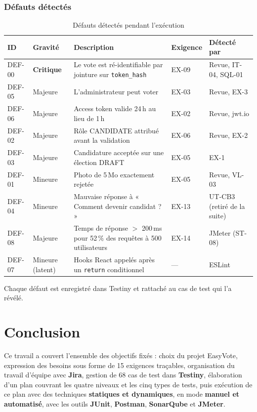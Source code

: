 \documentclass[12pt,a4paper]{report}
\begin{document}
\subsection{Défauts détectés}
\begin{table}[H]
\centering
\caption{Défauts détectés pendant l'exécution}
\small
\begin{tabularx}{\textwidth}{@{}p{1.5cm}p{1.8cm}Xp{1.5cm}p{3.1cm}@{}}
\toprule
\rowcolor{evlight}\textbf{ID} & \textbf{Gravité} & \textbf{Description} & \textbf{Exigence} & \textbf{Détecté par}\\
\midrule
DEF-00 & \textcolor{kored}{\textbf{Critique}} & Le vote est ré-identifiable par jointure sur \texttt{token\_hash} & EX-09 & Revue, IT-04, SQL-01\\
DEF-05 & Majeure & L'administrateur peut voter & EX-03 & Revue, EX-3\\
DEF-06 & Majeure & Access token valide 24\,h au lieu de 1\,h & EX-02 & Revue, jwt.io\\
DEF-02 & Majeure & Rôle CANDIDATE attribué avant la validation & EX-06 & Revue, EX-2\\
DEF-03 & Majeure & Candidature acceptée sur une élection DRAFT & EX-05 & EX-1\\
DEF-01 & Mineure & Photo de 5\,Mo exactement rejetée & EX-05 & Revue, VL-03\\
DEF-04 & Mineure & Mauvaise réponse à « Comment devenir candidat ? » & EX-13 & UT-CB3 (retiré de la suite)\\
DEF-08 & Majeure & Temps de réponse $>$ 200\,ms pour 52\,\% des requêtes à 500 utilisateurs & EX-14 & JMeter (ST-08)\\
DEF-07 & Mineure (latent) & Hooks React appelés après un \texttt{return} conditionnel & --- & ESLint\\
\bottomrule
\end{tabularx}
\end{table}
Chaque défaut est enregistré dans Testiny et rattaché au cas de test qui l'a révélé.

\chapter*{Conclusion}

Ce travail a couvert l'ensemble des objectifs fixés : choix du projet EasyVote, expression des besoins sous forme de 15 exigences traçables, organisation du travail d'équipe avec \textbf{Jira}, gestion de 68 cas de test dans \textbf{Testiny}, élaboration d'un plan couvrant les quatre niveaux et les cinq types de tests, puis exécution de ce plan avec des techniques \textbf{statiques et dynamiques}, en mode \textbf{manuel et automatisé}, avec les outils \textbf{JUnit}, \textbf{Postman}, \textbf{SonarQube} et \textbf{JMeter}.
\end{document}
